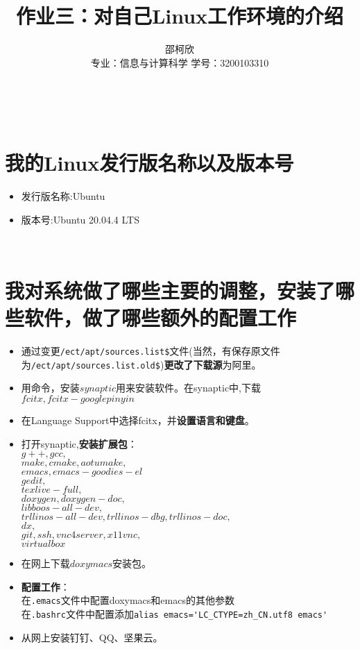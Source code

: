 \documentclass{ctexart}
\title{作业三：对自己Linux工作环境的介绍}
\author{邵柯欣\\专业：信息与计算科学 学号：3200103310}
\begin{document}
\maketitle
~\\

\section{我的Linux发行版名称以及版本号}

\begin{itemize}
\item 发行版名称:Ubuntu
\item 版本号:Ubuntu 20.04.4 LTS
\end{itemize}
~\\


\section{我对系统做了哪些主要的调整，安装了哪些软件，做了哪些额外的配置工作}

\begin{itemize}
\item 通过变更\verb|/ect/apt/sources.list$|文件(当然，有保存原文件为\verb|/ect/apt/sources.list.old$|){\bf 更改了下载源}为阿里。
\item 用命令，安装$synaptic$用来安装软件。在synaptic中,下载$fcitx,fcitx-googlepinyin$
\item 在Language Support中选择fcitx，并{\bf 设置语言和键盘}。
  \newpage
\item 打开synaptic,{\bf 安装扩展包}：
\\$g++,gcc,$
\\$make,cmake,aotumake,$
\\$emacs,emacs-goodies-el$
\\$gedit,$
\\$texlive-full,$
\\$doxygen,doxygen-doc,$
\\$libboos-all-dev,$
\\$trllinos-all-dev,trllinos-dbg,trllinos-doc,$
\\$dx,$
\\$git,ssh,vnc4server,x11vnc,$
\\$virtualbox$
\item 在网上下载$doxymacs$安装包。
\item {\bf 配置工作}：
\\在\verb|.emacs|文件中配置doxymacs和emacs的其他参数
\\在\verb|.bashrc|文件中配置添加\verb|alias emacs='LC_CTYPE=zh_CN.utf8 emacs'|
\item 从网上安装钉钉、QQ、坚果云。
\end{itemize}
~\\
\end{document}

